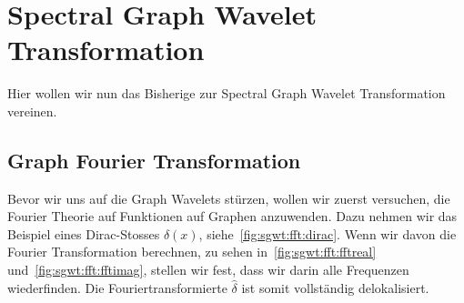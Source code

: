 
\section{Spectral Graph Wavelet Transformation\label{sec:sgwt:wavelets}}

Hier wollen wir nun das Bisherige zur Spectral Graph Wavelet Transformation 
vereinen.

\subsection{Graph Fourier Transformation\label{subsec:sgwt:gft}}

Bevor wir uns auf die Graph Wavelets st\"urzen, wollen wir zuerst versuchen, 
die Fourier Theorie auf Funktionen auf Graphen anzuwenden. Dazu nehmen wir das 
Beispiel eines Dirac-Stosses $\delta(x)$, siehe~\cref{fig:sgwt:fft:dirac}.
Wenn wir davon die Fourier Transformation berechnen, zu sehen 
in~\cref{fig:sgwt:fft:fftreal} und~\cref{fig:sgwt:fft:fftimag}, stellen wir 
fest, dass wir darin alle Frequenzen wiederfinden. Die Fouriertransformierte 
$\hat{\delta}$ ist somit vollst\"andig delokalisiert.
